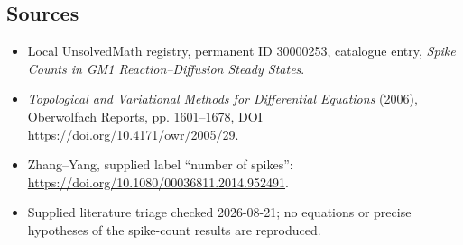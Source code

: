 \documentclass[11pt]{article}
\begin{document}
\subsection{Sources}
\begin{itemize}
\item Local UnsolvedMath registry, permanent ID 30000253, catalogue entry, \emph{Spike Counts in GM1 Reaction--Diffusion Steady States}.
\item \emph{Topological and Variational Methods for Differential Equations} (2006), Oberwolfach Reports, pp. 1601--1678, DOI \url{https://doi.org/10.4171/owr/2005/29}.
\item Zhang--Yang, supplied label ``number of spikes'': \url{https://doi.org/10.1080/00036811.2014.952491}.
\item Supplied literature triage checked 2026-08-21; no equations or precise hypotheses of the spike-count results are reproduced.
\end{itemize}
\end{document}
